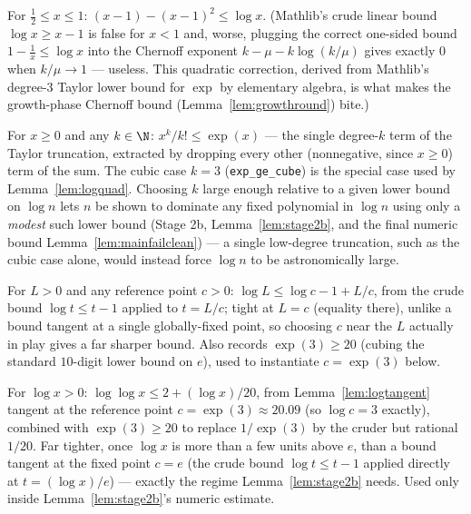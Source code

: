 \begin{lemma}\label{lem:logquad}
  \leanok
  For $\tfrac12 \le x \le 1$: $(x-1)-(x-1)^2 \le \log x$. (Mathlib's crude
  linear bound $\log x \ge x-1$ is false for $x<1$ and, worse, plugging the
  correct one-sided bound $1-\tfrac1x\le\log x$ into the Chernoff exponent
  $k-\mu-k\log(k/\mu)$ gives exactly $0$ when $k/\mu\to1$ --- useless. This
  quadratic correction, derived from Mathlib's degree-$3$ Taylor lower bound
  for $\exp$ by elementary algebra, is what makes the growth-phase Chernoff
  bound (Lemma~\ref{lem:growthround}) bite.)
\end{lemma}

\begin{lemma}\label{lem:exppow}
  \leanok
  For $x\ge0$ and any $k\in\N$: $x^k/k! \le \exp(x)$ --- the single
  degree-$k$ term of the Taylor truncation, extracted by dropping every
  other (nonnegative, since $x\ge0$) term of the sum. The cubic case
  $k=3$ (\texttt{exp\_ge\_cube}) is the special case used by
  Lemma~\ref{lem:logquad}. Choosing $k$ large enough relative to a given
  lower bound on $\log n$ lets $n$ be shown to dominate any fixed
  polynomial in $\log n$ using only a \emph{modest} such lower bound
  (Stage 2b, Lemma~\ref{lem:stage2b}, and the final numeric bound
  Lemma~\ref{lem:mainfailclean}) --- a single low-degree truncation, such
  as the cubic case alone, would instead force $\log n$ to be
  astronomically large.
\end{lemma}

\begin{lemma}\label{lem:logtangent}
  \leanok
  For $L>0$ and any reference point $c>0$: $\log L \le \log c - 1 + L/c$,
  from the crude bound $\log t \le t - 1$ applied to $t = L/c$; tight at
  $L=c$ (equality there), unlike a bound tangent at a single globally-fixed
  point, so choosing $c$ near the $L$ actually in play gives a far sharper
  bound. Also records $\exp(3)\ge20$ (cubing the standard $10$-digit lower
  bound on $e$), used to instantiate $c=\exp(3)$ below.
\end{lemma}

\begin{lemma}\label{lem:loglog}
  \leanok
  For $\log x>0$: $\log\log x \le 2 + (\log x)/20$, from
  Lemma~\ref{lem:logtangent} tangent at the reference point
  $c=\exp(3)\approx20.09$ (so $\log c = 3$ exactly), combined with
  $\exp(3)\ge20$ to replace $1/\exp(3)$ by the cruder but rational $1/20$.
  Far tighter, once $\log x$ is more than a few units above $e$, than a
  bound tangent at the fixed point $c=e$ (the crude bound $\log t\le t-1$
  applied directly at $t=(\log x)/e$) --- exactly the regime
  Lemma~\ref{lem:stage2b} needs. Used only inside Lemma~\ref{lem:stage2b}'s
  numeric estimate.
\end{lemma}

